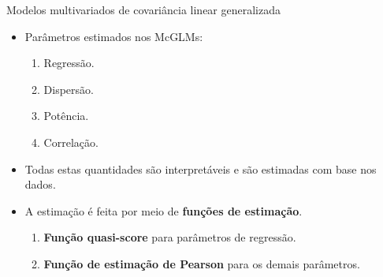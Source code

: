 \documentclass[
  ignorenonframetext,
  serif,
  professionalfont,
  usenames,
  dvipsnames,
  aspectratio = 169]{beamer}
\begin{document}
\begin{frame}{Modelos multivariados de covariância linear generalizada}
\protect\hypertarget{modelos-multivariados-de-covariuxe2ncia-linear-generalizada-7}{}
\begin{itemize}

\itemsep 2ex
  
  \item Parâmetros estimados nos McGLMs:
    \begin{enumerate}
      \item Regressão.
      \item Dispersão.
      \item Potência.
      \item Correlação.
    \end{enumerate}
  
  \item Todas estas quantidades são interpretáveis e são estimadas com base nos dados.
  
  \item A estimação é feita por meio de \textbf{funções de estimação}.
    \begin{enumerate}
      \item \textbf{Função quasi-score} para parâmetros de regressão. 
      \item \textbf{Função de estimação de Pearson} para os demais parâmetros. 
    \end{enumerate}

\end{itemize}
\end{frame}
\end{document}
